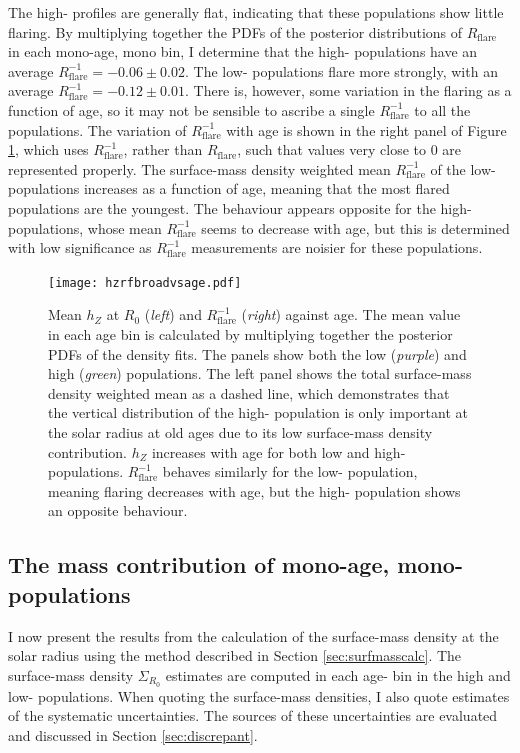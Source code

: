 The high-\afe{} profiles are generally flat, indicating that these populations show little flaring. By multiplying together the PDFs of the posterior distributions of $R_{\mathrm{flare}}$ in each mono-age, mono\feh{} bin, I determine that the high-\afe{} populations have an average $R_{\mathrm{flare}}^{-1} = -0.06 \pm 0.02$. The low-\afe{} populations flare more strongly, with an average $R_{\mathrm{flare}}^{-1} = -0.12 \pm 0.01$. There is, however, some variation in the flaring as a function of age, so it may not be sensible to ascribe a single $R_{\mathrm{flare}}^{-1}$ to all the populations. The variation of $R_{\mathrm{flare}}^{-1}$ with age is shown in the right panel of Figure \ref{fig:agevshzrf}, which uses $R_{\mathrm{flare}}^{-1}$, rather than $R_{\mathrm{flare}}$, such that values very close to 0 are represented properly. The surface-mass density weighted mean $R_{\mathrm{flare}}^{-1}$ of the low-\afe{} populations increases as a function of age, meaning that the most flared populations are the youngest. The behaviour appears opposite for the high-\afe{} populations, whose mean $R_{\mathrm{flare}}^{-1}$ seems to decrease with age, but this is determined with low significance as $R_{\mathrm{flare}}^{-1}$ measurements are noisier for these populations.

\begin{figure}
	\texttt{[image: hzrfbroadvsage.pdf]}
    \caption[$h_Z$ and $R_\mathrm{flare}^{-1}$ as a function of age for high and low-\afe{} mono-age populations in APOGEE DR12]{ Mean $h_Z$ at $R_0$ (\emph{left}) and $R_{\mathrm{flare}}^{-1}$ (\emph{right}) against age. The mean value in each age bin is calculated by multiplying together the posterior PDFs of the density fits. The panels show both the low (\emph{purple}) and high (\emph{green}) \afe{} populations. The left panel shows the total surface-mass density weighted mean as a dashed line, which demonstrates that the vertical distribution of the high-\afe{} population is only important at the solar radius at old ages due to its low surface-mass density contribution. $h_Z$ increases with age for both low and high-\afe{} populations. $R_{\mathrm{flare}}^{-1}$ behaves similarly for the low-\afe{} population, meaning flaring decreases with age, but the high-\afe{} population shows an opposite behaviour.}
     \label{fig:agevshzrf}
\end{figure}

\subsection{The mass contribution of mono-age, mono-\feh{} populations}
\label{sec:surfmassdens}
I now present the results from the calculation of the surface-mass density at the solar radius using the method described in Section \ref{sec:surfmasscalc}. The surface-mass density $\Sigma_{R_0}$ estimates are computed in each age-\feh{} bin in the high and low-\afe{} populations. When quoting the surface-mass densities, I also quote estimates of the systematic uncertainties. The sources of these uncertainties are evaluated and discussed in Section \ref{sec:discrepant}.

